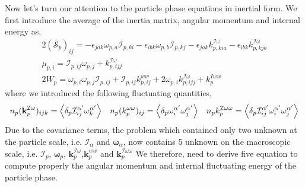 Now let's turn our attention to the particle phase equations in inertial form. 
We first introduce the average of the inertia matrix, angular momentum and internal energy as,
\begin{align}
    \label{eq:Sp_def}
    2(\mathcal{S}_{p})_{ij}
    = - \epsilon_{jak} \omega_{p,a} \mathcal{I}_{p,ki}
    - \epsilon_{ibk}   \omega_{p,b} \mathcal{I}_{p,kj}
    - \epsilon_{jak} k_{p,kia}^{\mathcal{I}\omega} 
    - \epsilon_{ibk} k_{p,kjb}^{\mathcal{I}\omega}
    \\
    \label{eq:mup_def}
    \mu_{p,i}
    = \mathcal{I}_{p,ij} \omega_{p,j}
    + k_{p,ijj}^{\mathcal{I}\omega}
    \\
    \label{eq:Wp_deformations}
    2 W_p 
    = 
    {\omega}_{p,i}{\omega}_{p,j} \mathcal{I}_{p,ij}
    + \mathcal{I}_{p,ij} {k}^{ww}_{p,ij}
    + 2 {\omega}_{p,i} {k}_{p,ijj}^{\mathcal{I}\omega}
    + k^{Iww}_p
\end{align}
where we introduced the following fluctuating quantities, 
\begin{align*}
    n_p(\textbf{k}_p^{\mathcal{I}\omega})_{ijk}
    = 
    \left<\delta_p \mathcal{I}^{\alpha'}_{ij} \omega^{\alpha'}_k\right>
    && n_p (k_p^{\omega\omega})_{ij}
    = 
    \left<\delta_p \omega^{\alpha'}_i \omega^{\alpha'}_j\right>
    && n_p{k}_p^{\mathcal{I}\omega\omega}
    = 
    \left<\delta_p \mathcal{I}^{\alpha'}_{ij} \omega^{\alpha'}_i\omega^{\alpha'}_j\right>
\end{align*}
Due to the covariance terms, the problem which contained only two unknown at the particle scale, i.e. $\mathcal{I}_\alpha$ and $\bm{\omega}_\alpha$, now contains 5 unknown on the macroscopic scale, i.e. $\mathcal{I}_p$, $\bm{\omega}_p$, $\textbf{k}^{\mathcal{I}\omega}_p$,$\textbf{k}^{ww}_p$ and $\textbf{k}_p^{\mathcal{I}\omega\omega}$
We therefore, need to derive five equation to compute properly the angular momentum and internal fluctuating energy of the particle phase. 


